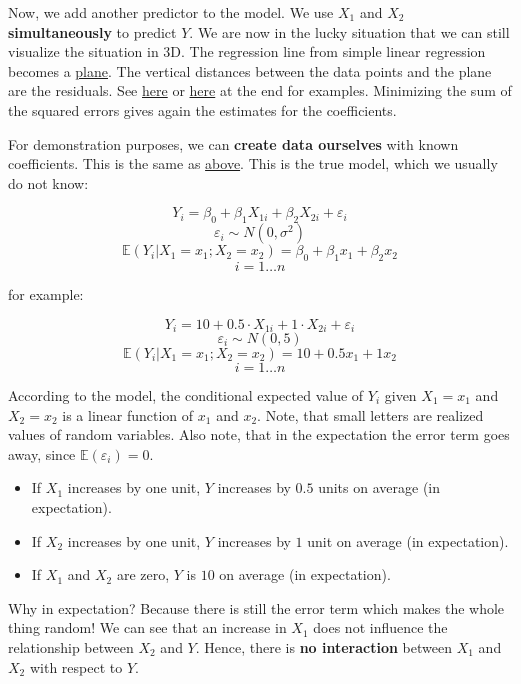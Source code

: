 \documentclass[
]{book}
\providecommand{\tightlist}{%
  \setlength{\itemsep}{0pt}\setlength{\parskip}{0pt}}
\begin{document}
Now, we add another predictor to the model. We use \(X_1\) and \(X_2\)
\textbf{simultaneously} to predict \(Y\). We are now in the lucky situation that
we can still visualize the situation in 3D. The regression line from simple
linear regression
becomes a \href{https://stackoverflow.com/questions/47344850/scatterplot3d-regression-plane-with-residuals}{plane}.
The vertical distances between the data points and the plane are the residuals.
See \href{https://rpubs.com/pjozefek/576206}{here} or
\href{https://www.sthda.com/english/wiki/scatterplot3d-3d-graphics-r-software-and-data-visualization}{here}
at the end for examples.
Minimizing the sum of the squared errors gives again
the estimates for the coefficients.

For demonstration purposes, we can \textbf{create data ourselves} with known
coefficients. This is the same as \hyperref[adding_predictor_bayes]{above}.
This is the true model, which we usually do not know:

\[ Y_i = \beta_0 + \beta_1 X_{1i} + \beta_2 X_{2i} + \varepsilon_i\]
\[ \varepsilon_i \sim N(0, \sigma^2)\]
\[ \mathbb{E}(Y_i|X_1 = x_1; X_2 = x_2) = \beta_0 + \beta_1 x_1 + \beta_2 x_2\]
\[ i = 1 \ldots n\]

for example:

\[ Y_i = 10 + 0.5 \cdot X_{1i} + 1 \cdot X_{2i} + \varepsilon_i\]
\[ \varepsilon_i \sim N(0, 5)\]
\[ \mathbb{E}(Y_i|X_1 = x_1; X_2 = x_2) = 10 + 0.5 x_1 + 1 x_2\]
\[ i = 1 \ldots n\]

According to the model, the conditional expected value of \(Y_i\) given \(X_1 = x_1\) and \(X_2 = x_2\)
is a linear function of \(x_1\) and \(x_2\). Note, that small letters are realized values
of random variables. Also note, that in the expectation the error term goes away, since
\(\mathbb{E}(\varepsilon_i) = 0\).

\begin{itemize}
\tightlist
\item
  If \(X_1\) increases by one unit, \(Y\) increases by \(0.5\) units on average (in expectation).
\item
  If \(X_2\) increases by one unit, \(Y\) increases by \(1\) unit on average (in expectation).
\item
  If \(X_1\) and \(X_2\) are zero, \(Y\) is \(10\) on average (in expectation).
\end{itemize}

Why in expectation? Because there is still the error term which makes the whole thing random!
We can see that an increase in \(X_1\) does not influence the relationship between \(X_2\) and \(Y\).
Hence, there is \textbf{no interaction} between \(X_1\) and \(X_2\) with respect to \(Y\).
\end{document}
